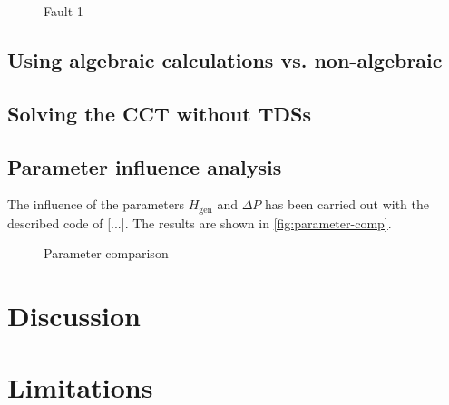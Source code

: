 \begin{figure}[H]
        \centering
        
        \caption[Fault 1]{Fault 1}
        \label{fig:fault1}
\end{figure}

\subsection{Using algebraic calculations vs. non-algebraic}

\subsection{Solving the \acs{CCT} without \acsp{TDS}}

\subsection{Parameter influence analysis}

The influence of the parameters $H_\mathrm{gen}$ and $\Delta P$ has been carried out with the described code of [...]. The results are shown in \autoref{fig:parameter-comp}.

\begin{figure}[H]
        \centering
        
        \caption[Parameter comparison]{Parameter comparison}
        \label{fig:parameter-comp}
\end{figure}

\section{Discussion}
\label{sec:discussion}



\section{Limitations}

